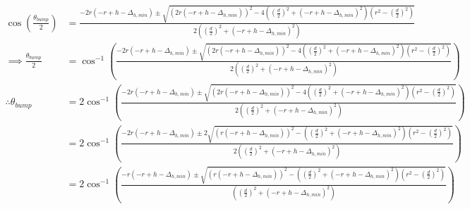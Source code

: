 \documentclass{article}
\begin{document}
	 \begin{align}
	 \cos \left({\frac{\theta_{bump}}{2}}\right) &= \frac{- 2 r \left(- r + h - \Delta_{h, min}\right) \pm \sqrt{\left(2 r \left(- r + h - \Delta_{h, min}\right)\right)^{2} - 4 \left(\left(\frac{d}{2}\right)^{2} + \left(- r + h - \Delta_{h, min}\right)^{2}\right) \left(r^{2} - \left(\frac{d}{2}\right)^{2}\right)}}{2 \left(\left(\frac{d}{2}\right)^{2} + \left(- r + h - \Delta_{h, min}\right)^{2}\right)} \\
	 \implies {\frac{\theta_{bump}}{2}} &= \cos^{-1} \left(\frac{- 2 r \left(- r + h - \Delta_{h, min}\right) \pm \sqrt{\left(2 r \left(- r + h - \Delta_{h, min}\right)\right)^{2} - 4 \left(\left(\frac{d}{2}\right)^{2} + \left(- r + h - \Delta_{h, min}\right)^{2}\right) \left(r^{2} - \left(\frac{d}{2}\right)^{2}\right)}}{2 \left(\left(\frac{d}{2}\right)^{2} + \left(- r + h - \Delta_{h, min}\right)^{2}\right)}\right) \\
	 \therefore \theta_{bump} &= 2 \cos^{-1} \left(\frac{- 2 r \left(- r + h - \Delta_{h, min}\right) \pm \sqrt{\left(2 r \left(- r + h - \Delta_{h, min}\right)\right)^{2} - 4 \left(\left(\frac{d}{2}\right)^{2} + \left(- r + h - \Delta_{h, min}\right)^{2}\right) \left(r^{2} - \left(\frac{d}{2}\right)^{2}\right)}}{2 \left(\left(\frac{d}{2}\right)^{2} + \left(- r + h - \Delta_{h, min}\right)^{2}\right)}\right) \\
	 &= 2 \cos^{-1} \left(\frac{- 2 r \left(- r + h - \Delta_{h, min}\right) \pm 2 \sqrt{\left(r \left(- r + h - \Delta_{h, min}\right)\right)^{2} - \left(\left(\frac{d}{2}\right)^{2} + \left(- r + h - \Delta_{h, min}\right)^{2}\right) \left(r^{2} - \left(\frac{d}{2}\right)^{2}\right)}}{2 \left(\left(\frac{d}{2}\right)^{2} + \left(- r + h - \Delta_{h, min}\right)^{2}\right)}\right) \\
	 &= 2 \cos^{-1} \left(\frac{- r \left(- r + h - \Delta_{h, min}\right) \pm \sqrt{\left(r \left(- r + h - \Delta_{h, min}\right)\right)^{2} - \left(\left(\frac{d}{2}\right)^{2} + \left(- r + h - \Delta_{h, min}\right)^{2}\right) \left(r^{2} - \left(\frac{d}{2}\right)^{2}\right)}}{\left(\left(\frac{d}{2}\right)^{2} + \left(- r + h - \Delta_{h, min}\right)^{2}\right)}\right)
	 \end{align}
	 
\end{document}
